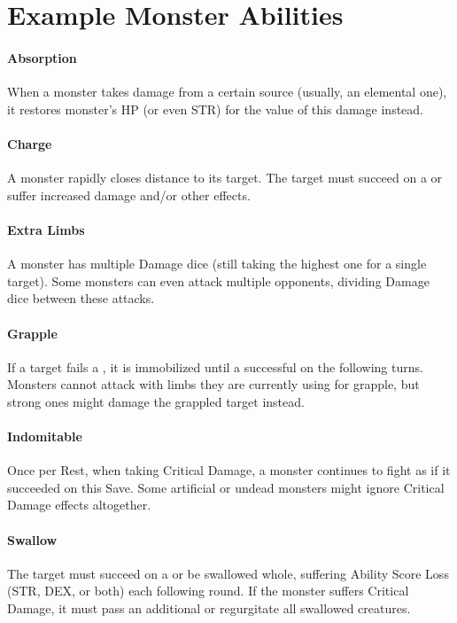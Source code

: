 \documentclass[itdr]{subfiles}
\begin{document}
\vfill
\break

\section{Example Monster Abilities}

\paragraph{Absorption}
When a monster takes damage from a certain source (usually, an elemental one), it restores monster's HP (or even STR) for the value of this damage instead.

\vfill
\paragraph{Charge}
A monster rapidly closes distance to its target. The target must succeed on a  or suffer increased damage and/or other effects.

\vfill
\paragraph{Extra Limbs}
A monster has multiple Damage dice (still taking the highest one for a single target). Some monsters can even attack multiple opponents, dividing Damage dice between these attacks.

\vfill
\paragraph{Grapple}
If a target fails a , it is immobilized until a successful  on the following turns. Monsters cannot attack with limbs they are currently using for grapple, but strong ones might damage the grappled target instead.

\vfill
\paragraph{Indomitable}
Once per Rest, when taking Critical Damage, a monster continues to fight as if it succeeded on this Save. Some artificial or undead monsters might ignore Critical Damage effects altogether.

\vfill
\paragraph{Swallow}
The target must succeed on a  or be swallowed whole, suffering Ability Score Loss (STR, DEX, or both) each following round. If the monster suffers Critical Damage, it must pass an additional  or regurgitate all swallowed creatures.
\end{document}
